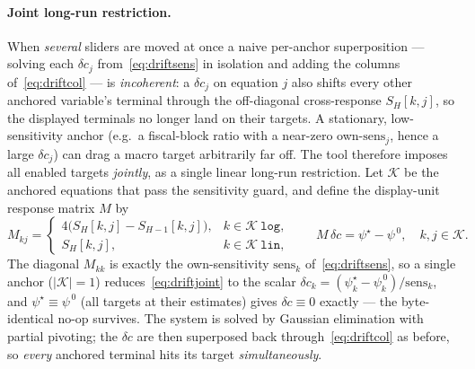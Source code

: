 \documentclass[11pt]{article}
\theoremstyle{definition}
\theoremstyle{remark}
\begin{document}
\paragraph{Joint long-run restriction.}
When \emph{several} sliders are moved at once a naive per-anchor
superposition --- solving each $\delta c_j$ from~\eqref{eq:driftsens} in
isolation and adding the columns of~\eqref{eq:driftcol} --- is
\emph{incoherent}: a $\delta c_j$ on equation $j$ also shifts every other
anchored variable's terminal through the off-diagonal cross-response
$S_H[k,j]$, so the displayed terminals no longer land on their targets.
A stationary, low-sensitivity anchor (e.g.\ a fiscal-block ratio with a
near-zero own-$\mathrm{sens}_j$, hence a large $\delta c_j$) can drag a
macro target arbitrarily far off. The tool therefore imposes all enabled
targets \emph{jointly}, as a single linear long-run restriction. Let
$\mathcal{K}$ be the anchored equations that pass the sensitivity guard,
and define the display-unit response matrix $M$ by
\begin{equation}\label{eq:driftjoint}
  M_{kj} =
  \begin{cases}
    4\bigl(S_H[k,j] - S_{H-1}[k,j]\bigr), & k \in \mathcal{K}\ \texttt{log},\\[2pt]
    S_H[k,j], & k \in \mathcal{K}\ \texttt{lin},
  \end{cases}
  \qquad
  M\,\delta c = \psi^\star - \psi^{\,0},
  \quad k,j \in \mathcal{K}.
\end{equation}
The diagonal $M_{kk}$ is exactly the own-sensitivity
$\mathrm{sens}_k$ of~\eqref{eq:driftsens}, so a single anchor
($|\mathcal{K}|=1$) reduces~\eqref{eq:driftjoint} to the scalar
$\delta c_k = (\psi^\star_k - \psi^{\,0}_k)/\mathrm{sens}_k$, and
$\psi^\star \equiv \psi^{\,0}$ (all targets at their estimates) gives
$\delta c \equiv 0$ exactly --- the byte-identical no-op survives. The
system is solved by Gaussian elimination with partial pivoting; the
$\delta c$ are then superposed back through~\eqref{eq:driftcol} as
before, so \emph{every} anchored terminal hits its target
\emph{simultaneously}.
\end{document}
